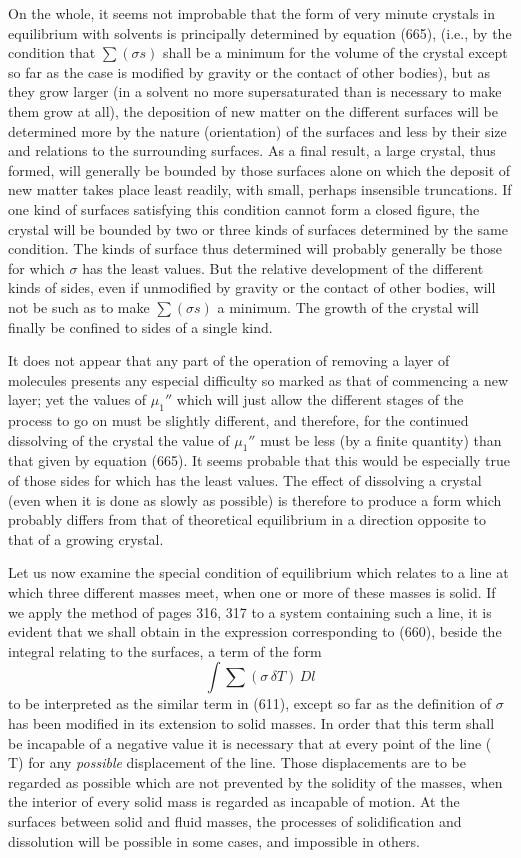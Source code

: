 \documentclass[12pt]{memoir}
\newcommand{\dd}{\delta}
\begin{document}
{On the whole, it seems not improbable that the form of very minute crystals in equilibrium with solvents is principally determined by equation (665), (i.e., by the condition that $\sum(\sigma s)$ shall be a minimum for the volume of the crystal except so far as the case is modified by gravity or the contact of other bodies), but as they grow larger (in a solvent no more supersaturated than is necessary to make them grow at all), the deposition of new matter on the different surfaces will be determined more by the nature (orientation) of the surfaces and less by their size and relations to the surrounding surfaces.  As a final result, a large crystal, thus formed, will generally be bounded by those surfaces alone on which the deposit of new matter takes place least readily, with small, perhaps insensible truncations. If one kind of surfaces satisfying this condition cannot form a closed figure, the crystal will be bounded by two or three kinds of surfaces determined by the same condition. The kinds of surface thus determined will probably generally be those for which $\sigma$ has the least values. But the relative development of the different kinds of sides, even if unmodified by gravity or the contact of other bodies, will not be such as to make $\sum(\sigma s)$ a minimum. The growth of the crystal will finally be confined to sides of a single kind.\par
It does not appear that any part of the operation of removing a layer of molecules presents any especial difficulty so marked as that of commencing a new layer; yet the values of $\mu_1''$ which will just allow the different stages of the process to go on must be slightly different, and therefore, for the continued dissolving of the crystal the value of $\mu_1''$ must be less (by a finite quantity) than that given by equation (665). It seems probable that this would be especially true of those sides for which  has the least values. The effect of dissolving a crystal (even when it is done as slowly as possible) is therefore to produce a form which probably differs from that of theoretical equilibrium in a direction opposite to that of a growing crystal.}

Let us now examine the special condition of equilibrium which relates to a line at which three different masses meet, when one or more of these masses is solid. If we apply the method of pages 316, 317 to a system containing such a line, it is evident that we shall obtain in the expression corresponding to (660), beside the integral relating to the surfaces, a term of the form
$$ \int \sum(\sigma \, \dd T) \, Dl$$
to be interpreted as the similar term in (611), except so far as the definition of $\sigma$ has been modified in its extension to solid masses. In order that this term shall be incapable of a negative value it is necessary that at every point of the line
\eqs \sum(\sigma \, \dd T)    \label{671} \eqe
for any \textit{possible} displacement of the line. Those displacements are to be regarded as possible which are not prevented by the solidity of the masses, when the interior of every solid mass is regarded as incapable of motion. At the surfaces between solid and fluid masses, the processes of solidification and dissolution will be possible in some cases, and impossible in others.
\end{document}
